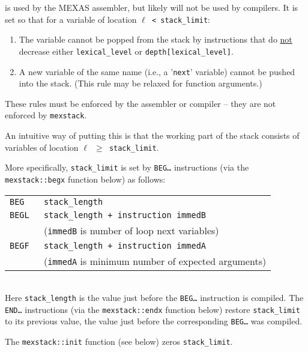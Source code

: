 \documentclass[12pt]{article}
\begin{document}
\begin{indpar}
 is used by the MEXAS assembler, but likely will not be
used by compilers.
It is set so that for a variable of location
{\tt $\ell$ < stack\_limit}\label{STACK-LIMIT}:
\begin{enumerate}
\item The variable cannot be popped from the stack by instructions
that do \underline{not} decrease either {\tt lexical\_level} or
{\tt depth[lexical\_level]}.
\item A new variable of the same name (i.e., a '{\tt next}' variable)
cannot be pushed into the stack.  (This rule may be relaxed for
function arguments.)
\end{enumerate}

These rules must be enforced by the assembler or
compiler -- they are not enforced
by {\tt mexstack}.

An intuitive way of putting this is that the working part of the
stack consists of variables of location {\tt $\ell$ $\geq$ stack\_limit}.

More specifically, {\tt stack\_limit} is set by {\tt BEG\ldots}
instructions (via the {\tt mexstack::\EOL begx} function below) as follows: \\
\hspace*{3em}\begin{tabular}{@{}ll}
\tt BEG & \tt stack\_length \\
\tt BEGL & \tt stack\_length + {\rm instruction} immedB \\
         & ({\tt immedB} is number of loop next variables) \\
\tt BEGF & \tt stack\_length + {\rm instruction} immedA \\
         & ({\tt immedA} is minimum number of expected arguments) \\
\end{tabular} \\
Here {\tt stack\_length} is the value just before the {\tt BEG\ldots}
instruction is compiled.
The {\tt END\ldots} instructions (via the {\tt mexstack::endx} function below)
restore {\tt stack\_\EOL limit} to its previous value, the value
just before the corresponding {\tt BEG\ldots} was compiled.

The {\tt mexstack::init} function (see below) zeros {\tt stack\_limit}.
\end{indpar}
\end{document}

